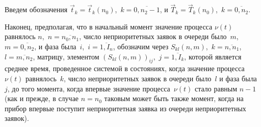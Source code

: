 \begin{multicols}{2}
Введем обозначения
$\vec t_k=\vec t_k(n_0)$,\  $k=\overline{0,n_2-1}$, и
$\vec T_k=\vec T_k(n_0)$,\  $k=\overline{0,n_2}$.


Наконец, предполагая, что в начальный момент значение процесса $\nu(t)$
равнялось $n$,\  $n=\overline{n_0,n_1}$, число неприоритетных
заявок в очереди было~$m$,\ $m=\overline{0,n_2}$, и фаза была~$i$,\ 
$i=\overline{1,I_{n}}$,
обозначим через $S_{kl}(n,m)$,\  $k=\overline{n,n_1}$,\ \
$l=\overline{m,n_2}$, мат\-ри\-цу, элементом $(S_{kl}(n,m))_{ij}$,\ 
$j=\overline{1,I_{k}}$, которой является среднее время,
проведенное сис\-те\-мой в со\-сто\-яни\-ях, когда значение процесса
$\nu(t)$ равнялось~$k$, число неприоритетных заявок в очереди
было~$l$ и фаза была~$j$, до того момента, когда впервые значение
процесса~$\nu(t)$ стало равным $n-1$ (как и прежде, в случае
$n=n_0$ таковым может быть также момент, когда на прибор
впервые поступит неприоритетная заявка из очереди неприоритетных
заявок).


\end{multicols}
